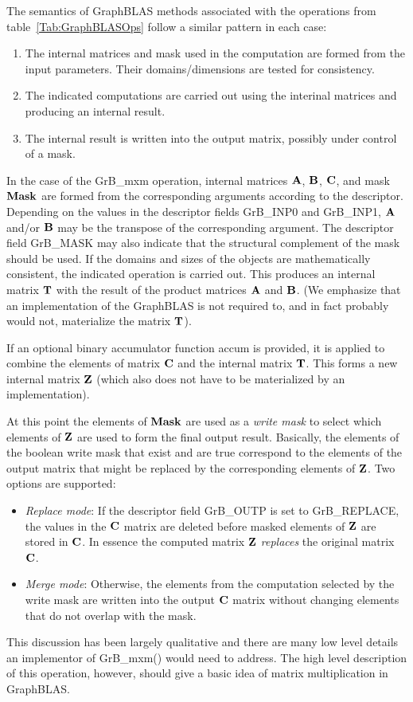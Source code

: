 The semantics of GraphBLAS methods associated with the operations from table~\ref{Tab:GraphBLASOps} follow a similar pattern
in each case:
\begin{enumerate}
\item The internal matrices and mask used in the computation are formed from the input parameters.  Their domains/dimensions are tested for consistency.
\item The indicated computations are carried out using the interinal matrices and producing an internal result.
\item The internal result is written into the output matrix, possibly under control of a mask.
\end{enumerate}
In the case of the {\sf GrB\_mxm} operation, internal matrices ${\bf A}$, ${\bf B}$, ${\bf C}$, and mask ${\bf Mask}$ are formed from
the corresponding arguments according to the descriptor.  Depending on
the values in the descriptor fields {\sf GrB\_INP0} and {\sf GrB\_INP1},  ${\bf A}$ and/or ${\bf B}$ may be the transpose of the corresponding argument.
The descriptor field {\sf GrB\_MASK} may also indicate that the structural complement of the mask 
should be used.  If the domains and sizes of the objects are mathematically consistent, the indicated operation is carried out.
This produces an internal matrix ${\bf T}$ with the result of the product matrices ${\bf A}$ and ${\bf B}$.
(We emphasize that an implementation
of the GraphBLAS is not required to, and in fact probably would not, materialize the matrix ${\bf T}$).

If an optional binary accumulator function {\sf accum} is provided, it is applied to combine the elements of 
matrix ${\bf C}$ and the internal matrix ${\bf T}$.  This forms a new internal matrix ${\bf Z}$ (which also does not have to be materialized by an implementation). 

At this point the elements of ${\bf Mask}$ are used as a \emph{write mask} to select which elements of ${\bf Z}$ are 
used to form the final output result.  Basically, the elements of the boolean write mask that exist and are true 
correspond to the elements of the output matrix that might be replaced by the corresponding elements of ${\bf Z}$.
Two options are supported: 
\begin{itemize}
	\item \emph{Replace mode}: If the descriptor field {\sf GrB\_OUTP} is set to {\sf GrB\_REPLACE}, the 
		values in the ${\bf C}$ matrix are deleted before masked elements of ${\bf Z}$ are stored 
		in ${\bf C}$.  In essence the computed matrix ${\bf Z}$ \emph{replaces} the original matrix ${\bf C}$.
	\item \emph{Merge mode}: Otherwise, the elements from the computation selected by the 
		write mask are written into the output ${\bf C}$ matrix without changing elements
		that do not overlap with the mask.
\end{itemize}
This discussion has been largely qualitative and there are many low level details an implementor
of {\sf GrB\_mxm()} would need to address.  The high level description of this operation, however, should
give a basic idea of matrix multiplication in GraphBLAS.

